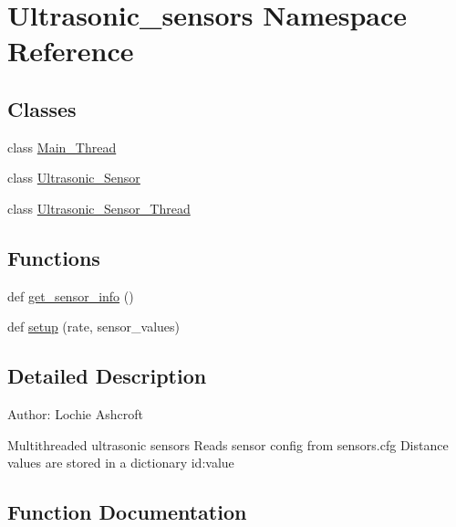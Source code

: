 \hypertarget{namespace_ultrasonic__sensors}{}\section{Ultrasonic\+\_\+sensors Namespace Reference}
\label{namespace_ultrasonic__sensors}
\subsection*{Classes}
\begin{DoxyCompactItemize}
\item 
class \mbox{\hyperlink{class_ultrasonic__sensors_1_1_main___thread}{Main\+\_\+\+Thread}}
\item 
class \mbox{\hyperlink{class_ultrasonic__sensors_1_1_ultrasonic___sensor}{Ultrasonic\+\_\+\+Sensor}}
\item 
class \mbox{\hyperlink{class_ultrasonic__sensors_1_1_ultrasonic___sensor___thread}{Ultrasonic\+\_\+\+Sensor\+\_\+\+Thread}}
\end{DoxyCompactItemize}
\subsection*{Functions}
\begin{DoxyCompactItemize}
\item 
def \mbox{\hyperlink{namespace_ultrasonic__sensors_aaab4452438d0023b72bc848ae679881d}{get\+\_\+sensor\+\_\+info}} ()
\item 
def \mbox{\hyperlink{namespace_ultrasonic__sensors_a57e901bee678edc609c318cdb0cc0bc3}{setup}} (rate, sensor\+\_\+values)
\end{DoxyCompactItemize}


\subsection{Detailed Description}
\begin{DoxyVerb}    Author: Lochie Ashcroft

    Multithreaded ultrasonic sensors
    Reads sensor config from sensors.cfg
    Distance values are stored in a dictionary {id:value}
\end{DoxyVerb}
 

\subsection{Function Documentation}
\mbox{\label{namespace_ultrasonic__sensors_aaab4452438d0023b72bc848ae679881d}} 

